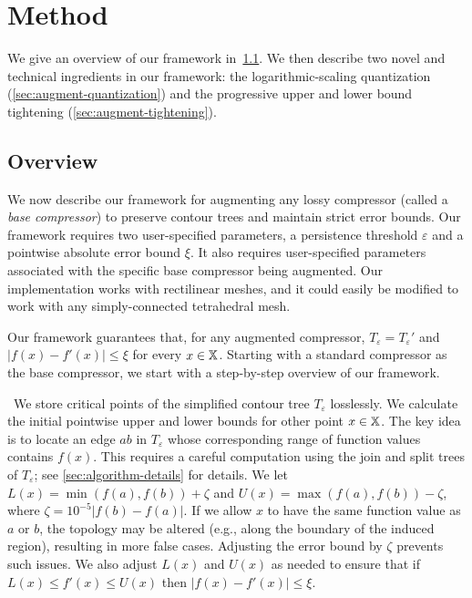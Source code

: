 \section{Method}
\label{sec:method}
We give an overview of our framework in~\cref{sec:method-overview}.
We then describe two novel and technical ingredients in our framework: the logarithmic-scaling quantization (\cref{sec:augment-quantization}) and the progressive upper and lower bound tightening (\cref{sec:augment-tightening}).

\subsection{Overview}
\label{sec:method-overview}

We now describe our framework for augmenting any lossy compressor (called a \emph{base compressor}) to preserve contour trees and maintain strict error bounds. 
Our framework requires two user-specified parameters, a persistence threshold $\varepsilon$ and a pointwise absolute error bound $\xi$. 
It also requires user-specified parameters associated with the specific base compressor being augmented. Our implementation works with rectilinear meshes, and it could easily be modified to work with any simply-connected tetrahedral mesh.

Our framework guarantees that, for any augmented compressor, $T_\varepsilon = T_\varepsilon'$ and $|f(x)-f'(x)| \leq \xi$ for every $x \in \mathbb{X}$. Starting with a standard compressor as the base compressor, we start with a step-by-step overview of our framework. 

~We store critical points of the simplified contour tree $T_\varepsilon$ losslessly. We calculate the initial pointwise upper and lower bounds for other point $x \in \mathbb{X}$. The key idea is to locate an edge $ab$ in $T_{\varepsilon}$ whose corresponding range of function values contains $f(x)$. This requires a careful computation using the join and split trees of $T_{\varepsilon}$; see \cref{sec:algorithm-details} for details. 
We let $L(x) = \min(f(a),f(b)) + \zeta$ and $U(x) = \max(f(a),f(b))-\zeta$, where $\zeta = 10^{-5}|f(b)-f(a)|$.
If we allow $x$ to have the same function value as $a$ or $b$, the topology may be altered (e.g., along the boundary of the induced region), resulting in more false cases. Adjusting the error bound by $\zeta$ prevents such issues. We also adjust $L(x)$ and $U(x)$ as needed to ensure that if $L(x) \leq f'(x) \leq U(x)$ then $|f(x)-f'(x)| \leq \xi$. 
 
